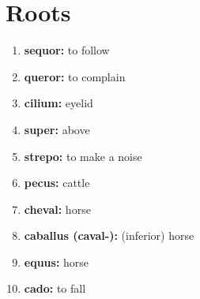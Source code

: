\documentclass{article}
\begin{document}
\section{Roots}
\begin{enumerate}
    \item \textbf{sequor: }{to follow}
    \item \textbf{queror: }{to complain}
    \item \textbf{cilium: }{eyelid}
    \item \textbf{super: }{above}
    \item \textbf{strepo: }{to make a noise}
    \item \textbf{pecus: }{cattle}
    \item \textbf{cheval: }{horse}
    \item \textbf{caballus (caval-): }{(inferior) horse}
    \item \textbf{equus: }{horse}
    \item \textbf{cado: }{to fall}
    
\end{enumerate}
\end{document}
